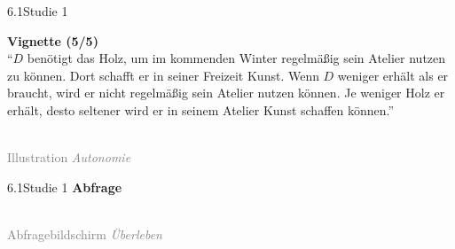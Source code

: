 \documentclass[xcolor=table,9pt,aspectratio=169]{beamer}
\begin{document}
\begin{frame}{\vspace*{10mm}6.1\hspace*{1em}Studie 1}
\begin{multicols}{2}
   \textbf{Vignette (5/5)}\\
   \medskip
   \enquote{$D$ benötigt das Holz, um im kommenden Winter regelmäßig sein Atelier nutzen zu können. Dort schafft er in seiner Freizeit Kunst. Wenn $D$ weniger erhält als er braucht, wird er nicht regelmäßig sein Atelier nutzen können. Je weniger Holz er erhält, desto seltener wird er in seinem Atelier Kunst schaffen können.}
   \vfill
   \begin{center}
      \\
      \textcolor{gray}{Illustration \textit{Autonomie}}
   \end{center}
\end{multicols}
\end{frame}


\begin{frame}{\vspace*{10mm}6.1\hspace*{1em}Studie 1}
\textbf{Abfrage}\\
\medskip
\begin{center}
   \\
   \textcolor{gray}{Abfragebildschirm \textit{Überleben}}
\end{center}
\end{frame}
\end{document}
